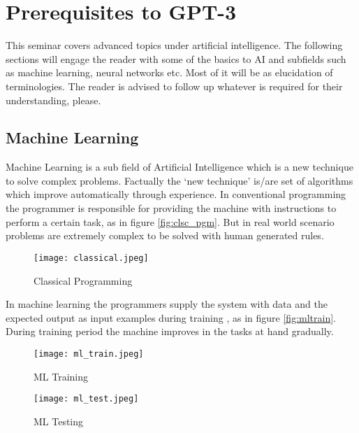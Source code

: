 \chapter*{Prerequisites to GPT-3}
\label{chap:prereq}
\thispagestyle{fancy}

\hspace{0.5cm} This seminar covers advanced topics under artificial intelligence. The following sections will engage the reader with some of the basics to AI and subfields such as machine learning, neural networks etc. Most of it will be as elucidation of terminologies. The reader is advised to follow up whatever is required for their understanding, please.

\section*{Machine Learning}
\label{sec:mchlrn}

\hspace{0.5cm} Machine Learning is a sub field of Artificial Intelligence which is a new technique to solve complex problems. Factually the `new technique' is/are set of algorithms which improve automatically through experience. In conventional programming the programmer is responsible for providing the machine with instructions to perform a certain task, as in figure \eqref{fig:clsc_pgm}. But in real world scenario problems are extremely complex to be solved with human generated rules.

\begin{figure}[!htbp]
    \centering
    \texttt{[image: classical.jpeg]}
    \caption[Classical Programming]{Classical Programming}
    \label{fig:clsc_pgm}
\end{figure}

In machine learning the programmers supply the system with data and the expected output as input examples during training \cite{devto:urfstai}, as in figure \eqref{fig:mltrain}. During training period the machine improves in the tasks at hand gradually.

\begin{figure}[!htbp]
    \centering
    \begin{minipage}{0.45\textwidth}
        \centering
        \texttt{[image: ml\_train.jpeg]}
        \caption[ML Training]{\centering ML Training }
        \label{fig:mltrain}
    \end{minipage}\hfill
    \begin{minipage}{0.45\textwidth}
        \centering
        \texttt{[image: ml\_test.jpeg]}
        \caption[ML Testing]{\centering ML Testing}
        \label{fig:mltest}
    \end{minipage}
\end{figure}

